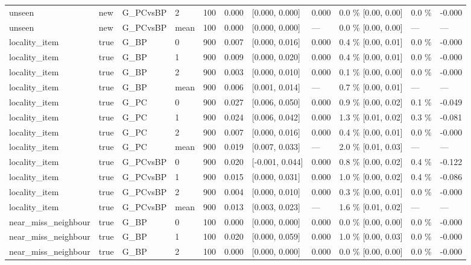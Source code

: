 \documentclass[10pt,a4paper]{article}
\begin{document}
\begin{center}
\begin{tabularx}{\textwidth}{@{}p{}XXXXXXXXXX@{}}
unseen & new & G\_PCvsBP & 2 & 100 & 0.000 & [0.000, 0.000] & 0.000 & 0.0 \% [0.00, 0.00] & 0.0 \% & -0.000 \\
unseen & new & G\_PCvsBP & mean & 100 & 0.000 & [0.000, 0.000] & — & 0.0 \% [0.00, 0.00] & — & — \\
locality\_item & true & G\_BP & 0 & 900 & 0.007 & [0.000, 0.016] & 0.000 & 0.4 \% [0.00, 0.01] & 0.0 \% & -0.000 \\
locality\_item & true & G\_BP & 1 & 900 & 0.009 & [0.000, 0.020] & 0.000 & 0.4 \% [0.00, 0.01] & 0.0 \% & -0.000 \\
locality\_item & true & G\_BP & 2 & 900 & 0.003 & [0.000, 0.010] & 0.000 & 0.1 \% [0.00, 0.00] & 0.0 \% & -0.000 \\
locality\_item & true & G\_BP & mean & 900 & 0.006 & [0.001, 0.014] & — & 0.7 \% [0.00, 0.01] & — & — \\
locality\_item & true & G\_PC & 0 & 900 & 0.027 & [0.006, 0.050] & 0.000 & 0.9 \% [0.00, 0.02] & 0.1 \% & -0.049 \\
locality\_item & true & G\_PC & 1 & 900 & 0.024 & [0.006, 0.042] & 0.000 & 1.3 \% [0.01, 0.02] & 0.3 \% & -0.081 \\
locality\_item & true & G\_PC & 2 & 900 & 0.007 & [0.000, 0.016] & 0.000 & 0.4 \% [0.00, 0.01] & 0.0 \% & -0.000 \\
locality\_item & true & G\_PC & mean & 900 & 0.019 & [0.007, 0.033] & — & 2.0 \% [0.01, 0.03] & — & — \\
locality\_item & true & G\_PCvsBP & 0 & 900 & 0.020 & [-0.001, 0.044] & 0.000 & 0.8 \% [0.00, 0.02] & 0.4 \% & -0.122 \\
locality\_item & true & G\_PCvsBP & 1 & 900 & 0.015 & [0.000, 0.031] & 0.000 & 1.0 \% [0.00, 0.02] & 0.4 \% & -0.086 \\
locality\_item & true & G\_PCvsBP & 2 & 900 & 0.004 & [0.000, 0.010] & 0.000 & 0.3 \% [0.00, 0.01] & 0.0 \% & -0.000 \\
locality\_item & true & G\_PCvsBP & mean & 900 & 0.013 & [0.003, 0.023] & — & 1.6 \% [0.01, 0.02] & — & — \\
near\_miss\_neighbour & true & G\_BP & 0 & 100 & 0.000 & [0.000, 0.000] & 0.000 & 0.0 \% [0.00, 0.00] & 0.0 \% & -0.000 \\
near\_miss\_neighbour & true & G\_BP & 1 & 100 & 0.020 & [0.000, 0.059] & 0.000 & 1.0 \% [0.00, 0.03] & 0.0 \% & -0.000 \\
near\_miss\_neighbour & true & G\_BP & 2 & 100 & 0.000 & [0.000, 0.000] & 0.000 & 0.0 \% [0.00, 0.00] & 0.0 \% & -0.000 \\

\end{tabularx}
\end{center}
\end{document}
